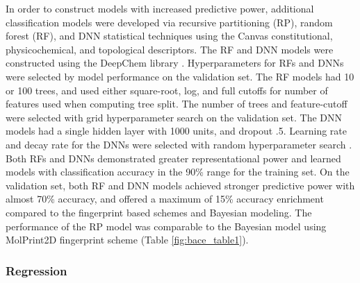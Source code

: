 In order to construct models with increased predictive power, additional classification models were developed via recursive partitioning (RP), random forest (RF), and DNN statistical techniques using the Canvas constitutional, physicochemical, and topological descriptors.  The RF and DNN models were constructed using the DeepChem library \cite{wu2017moleculenet}. Hyperparameters for RFs and DNNs were selected by model performance on the validation set. The RF models had 10 or 100 trees, and used either square-root, log, and full cutoffs for number of features used when computing tree split. The number of trees and feature-cutoff were selected with grid hyperparameter search on the validation set. The DNN models had a single hidden layer with 1000 units, and dropout .5. Learning rate and decay rate for the DNNs were selected with random hyperparameter search \cite{bergstra2012random}. Both RFs and DNNs demonstrated greater representational power and learned models with classification accuracy in the 90\% range for the training set.  On the validation set, both RF and DNN models achieved stronger predictive power with almost 70\% accuracy, and offered a maximum of 15\% accuracy enrichment compared to the fingerprint based schemes and Bayesian modeling.  The performance of the RP model was comparable to the Bayesian model using MolPrint2D fingerprint scheme (Table \ref{fig:bace_table1}). 

\subsubsection{Regression}

